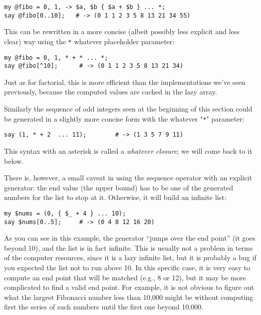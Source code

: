 \begin{verbatim}
my @fibo = 0, 1, -> $a, $b { $a + $b } ... *;
say @fibo[0..10];   # -> (0 1 1 2 3 5 8 13 21 34 55)
\end{verbatim}

This can be rewritten in a more concise (albeit possibly 
less explicit and less clear) way using the \verb'*' 
whatever placeholder parameter:

\begin{verbatim}
my @fibo = 0, 1, * + * ... *;
say @fibo[^10];      # -> (0 1 1 2 3 5 8 13 21 34)
\end{verbatim}

Just as for factorial, this is more efficient than the 
implementations we've seen previously, because the 
computed values are cached in the lazy array.

Similarly the sequence of odd integers seen at the 
beginning of this section could be generated in a 
slightly more concise form with the whatever "\verb'*'" 
parameter:

\begin{verbatim}
say (1, * + 2  ... 11);        # -> (1 3 5 7 9 11)
\end{verbatim}

This syntax with an asterisk is called a 
\emph{whatever closure}; we will come back to 
it below.

There is, however, a small caveat in using the sequence operator with 
an explicit generator: the end value (the upper bound) has 
to be one of the generated numbers for the list to stop at 
it. Otherwise, it will build an infinite list:

\begin{verbatim}
my $nums = (0, { $_ + 4 } ... 10);
say $nums[0..5];     # -> (0 4 8 12 16 20)
\end{verbatim}

As you can see in this example, the generator ``jumps over the end 
point'' (it goes beyond 10), and the list is 
in fact infinite. This is usually not a problem 
in terms of the computer resources, since it is 
a lazy infinite list, but it is probably a bug if 
you expected the list not to run above 10. In this 
specific case, it is very easy to compute an end 
point that will be matched (e.g., 8 or 12), but it may be 
more complicated to find a valid end point. For example, 
it is not obvious to figure out what the largest 
Fibonacci number less than 10,000 might be without 
computing first the series of such numbers until the 
first one beyond 10,000.

